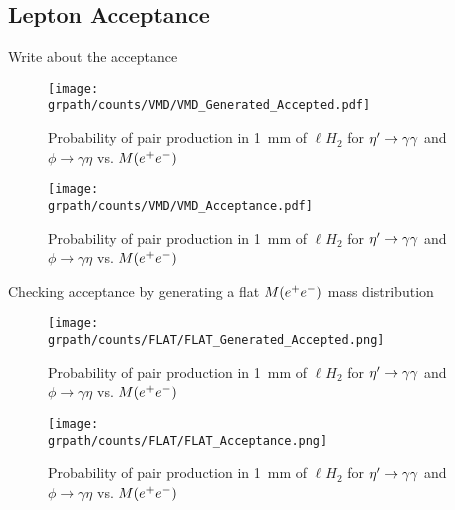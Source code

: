 \subsection{Lepton Acceptance}\label{sec.acceptance}
Write about the acceptance
\begin{figure}[h!]\begin{center}
		\texttt{[image: \\grpath/counts/VMD/VMD\_Generated\_Accepted.pdf]}
		\caption[Probability of pair production, $\gamma \to$\epemT, as a function of $M(\epem)$]{\label{fig:VMD}{Probability of pair production in 1~mm of  $\ell H_2$ for $\eta^{\prime} \to \gamma \gamma $ and $\phi \to \gamma \eta$  vs. $M(\epem)$}}
\end{center}\end{figure}


\begin{figure}[h!]\begin{center}
		\texttt{[image: \\grpath/counts/VMD/VMD\_Acceptance.pdf]}
		\caption[Probability of pair production, $\gamma \to$\epemT, as a function of $M(\epem)$]{\label{fig:conversion_inM}{Probability of pair production in 1~mm of  $\ell H_2$ for $\eta^{\prime} \to \gamma \gamma $ and $\phi \to \gamma \eta$  vs. $M(\epem)$}}
\end{center}\end{figure}


Checking acceptance by generating a flat $M(\epem)$ mass distribution
 \begin{figure}[h!]\begin{center}
 		\texttt{[image: \\grpath/counts/FLAT/FLAT\_Generated\_Accepted.png]}
 		\caption[Probability of pair production, $\gamma \to$\epemT, as a function of $M(\epem)$]{\label{fig:conversion_inM}{Probability of pair production in 1~mm of  $\ell H_2$ for $\eta^{\prime} \to \gamma \gamma $ and $\phi \to \gamma \eta$  vs. $M(\epem)$}}
 \end{center}\end{figure}
 
 
 \begin{figure}[h!]\begin{center}
 		\texttt{[image: \\grpath/counts/FLAT/FLAT\_Acceptance.png]}
 		\caption[Probability of pair production, $\gamma \to$\epemT, as a function of $M(\epem)$]{\label{fig:conversion_inM}{Probability of pair production in 1~mm of  $\ell H_2$ for $\eta^{\prime} \to \gamma \gamma $ and $\phi \to \gamma \eta$  vs. $M(\epem)$}}
 \end{center}\end{figure} 

